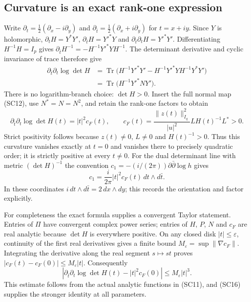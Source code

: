 \subsection{Curvature is an exact rank-one expression}

Write $\partial_t=\tfrac12(\partial_x-i\partial_y)$ and
$\partial_{\bar t}=\tfrac12(\partial_x+i\partial_y)$ for $t=x+iy$.
Since $Y$ is holomorphic,
$\partial_tH=Y^*Y'$,
$\partial_{\bar t}H=Y'^*Y$ and
$\partial_{\bar t}\partial_tH=Y'^*Y'$.
Differentiating $H^{-1}H=I_p$ gives
$\partial_{\bar t}H^{-1}=-H^{-1}Y'^*YH^{-1}$.
The determinant derivative and cyclic invariance of trace therefore give
\[
\begin{split}
 \partial_{\bar t}\partial_t\log\det H
 &=\operatorname{Tr}\bigl(H^{-1}Y'^*Y'
   -H^{-1}Y'^*YH^{-1}Y^*Y'\bigr)\\
 &=\operatorname{Tr}\bigl(H^{-1}Y'^*N Y'\bigr).
\end{split}\tag{SC15}
\]
There is no logarithm-branch choice: $\det H>0$.
Insert the full normal map (SC12), use $N^*=N=N^2$, and retain
the rank-one factors to obtain
\[
 \boxed{\partial_{\bar t}\partial_t\log\det H(t)
   =|t|^2 c_F(t),\qquad
 c_F(t)=\frac{\|z(t)\|_{I_q}^2}{|u|^2}
                   L H(t)^{-1}L^*>0.}
 \tag{SC16}
\]
Strict positivity follows because $z(t)\ne0$, $L\ne0$ and
$H(t)^{-1}>0$.  Thus this curvature vanishes exactly at $t=0$
and vanishes there to precisely quadratic order; it is strictly
positive at every $t\ne0$.  For the dual determinant line with metric
$(\det H)^{-1}$ the convention
$c_1=-(i/(2\pi))\partial\bar\partial\log h$ gives
\[
 c_1=\frac i{2\pi}|t|^2c_F(t)\,dt\wedge d\bar t.
 \tag{SC17}
\]
In these coordinates $i\,dt\wedge d\bar t=2\,dx\wedge dy$;
this records the orientation and factor explicitly.

For completeness the exact formula supplies a convergent Taylor
statement.  Entries of $\Pi$ have convergent complex power series;
entries of $H$, $P$, $N$ and $c_F$ are real analytic because
$\det H$ is everywhere positive.  On any closed disk
$|t|\leq\varepsilon$, continuity of the first real derivatives gives
a finite bound $M_\varepsilon=\sup\|\nabla c_F\|$.
Integrating the derivative along the real segment $s\mapsto st$ proves
$|c_F(t)-c_F(0)|\leq M_\varepsilon|t|$.  Consequently
\[
 \left|\partial_{\bar t}\partial_t\log\det H(t)
                  -|t|^2c_F(0)\right|
 \leq M_\varepsilon|t|^3.
 \tag{SC18}
\]
This estimate follows from the actual analytic functions in (SC11),
and (SC16) supplies the stronger identity at all parameters.

